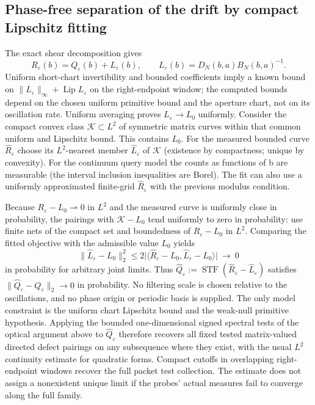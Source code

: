 \documentclass[11pt]{article}
\begin{document}
\subsection{Phase-free separation of the drift by compact Lipschitz fitting}\label{phase-free-separation-of-the-drift-by-compact-lipschitz-fitting}

The exact shear decomposition gives
\[
R_\varepsilon(b)=Q_\varepsilon(b)+L_\varepsilon(b),\qquad
L_\varepsilon(b)=D_N(b,a)B_N(b,a)^{-1}.
\]
Uniform short-chart invertibility and bounded coefficients imply a known bound on \(\|L_\varepsilon\|_\infty+\operatorname{Lip}L_\varepsilon\) on the right-endpoint window; the computed bounds depend on the chosen uniform primitive bound and the aperture chart, not on its oscillation rate. Uniform averaging proves \(L_\varepsilon\to L_0\) uniformly. Consider the compact convex class \(\mathcal K\subset L^2\) of symmetric matrix curves within that common uniform and Lipschitz bound. This contains \(L_0\). For the measured bounded curve \(\widehat R_\varepsilon\) choose its \(L^2\)-nearest member \(\widehat L_\varepsilon\) of \(\mathcal K\) (existence by compactness; unique by convexity). For the continuum query model the counts as functions of b are measurable (the interval inclusion inequalities are Borel). The fit can also use a uniformly approximated finite-grid \(\widehat R_\varepsilon\) with the previous modulus condition.

Because \(R_\varepsilon-L_0\rightharpoonup0\) in \(L^2\) and the measured curve is uniformly close in probability, the pairings with \(\mathcal K-L_0\) tend uniformly to zero in probability: use finite nets of the compact set and boundedness of \(R_\varepsilon-L_0\) in \(L^2\). Comparing the fitted objective with the admissible value \(L_0\) yields
\[
\|\widehat L_\varepsilon-L_0\|_2^2
 \le 2\big|\langle\widehat R_\varepsilon-L_0,\widehat L_\varepsilon-L_0\rangle\big|
 \ \longrightarrow\ 0
\]
in probability for arbitrary joint limits. Thus
\(\widehat Q_\varepsilon:=\operatorname{STF}(\widehat R_\varepsilon-\widehat L_\varepsilon)\)
satisfies \(\|\widehat Q_\varepsilon-Q_\varepsilon\|_2\to0\) in probability. No filtering scale is chosen relative to the oscillations, and no phase origin or periodic basis is supplied. The only model constraint is the uniform chart Lipschitz bound and the weak-null primitive hypothesis. Applying the bounded one-dimensional signed spectral tests of the optical argument above to \(\widehat Q_\varepsilon\) therefore recovers all fixed tested matrix-valued directed defect pairings on any subsequence where they exist, with the usual \(L^2\) continuity estimate for quadratic forms. Compact cutoffs in overlapping right-endpoint windows recover the full packet test collection. The estimate does not assign a nonexistent unique limit if the probes' actual measures fail to converge along the full family.
\end{document}
